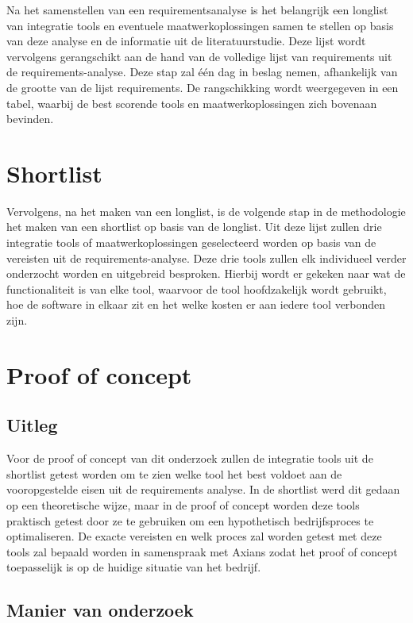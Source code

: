 Na het samenstellen van een requirementsanalyse is het belangrijk een longlist van integratie tools en eventuele maatwerkoplossingen samen te stellen op basis van deze
analyse en de informatie uit de literatuurstudie. Deze lijst wordt vervolgens gerangschikt aan de hand van de volledige lijst van requirements uit de requirements-analyse. Deze stap zal één dag in beslag nemen, afhankelijk van de grootte van de lijst requirements. De rangschikking wordt weergegeven in een tabel, waarbij de best scorende tools en maatwerkoplossingen zich bovenaan bevinden.

\section{Shortlist}
\label{sec:ShortlistBP}

Vervolgens, na het maken van een longlist, is de volgende stap in de methodologie het maken van een shortlist op basis van de longlist. Uit deze lijst zullen drie integratie tools of maatwerkoplossingen geselecteerd worden op basis van de vereisten uit de requirements-analyse. Deze drie tools zullen elk individueel verder onderzocht worden en uitgebreid besproken. Hierbij wordt er gekeken naar wat de functionaliteit is van elke tool, waarvoor de tool hoofdzakelijk wordt gebruikt, hoe de software in elkaar zit en het welke kosten er aan iedere tool verbonden zijn.

\section{Proof of concept}
\label{sec:Proof of conceptBP}

\subsection{Uitleg}
\label{sec:UitlegBP}

Voor de proof of concept van dit onderzoek zullen de integratie tools uit de shortlist getest worden om te zien welke tool het best voldoet aan de vooropgestelde eisen uit de requirements analyse. In de shortlist werd dit gedaan op een theoretische wijze, maar in de proof of concept worden deze tools praktisch getest door ze te gebruiken om een hypothetisch bedrijfsproces te optimaliseren. De exacte vereisten en welk proces zal worden getest met deze tools zal bepaald worden in samenspraak met Axians zodat het proof of concept toepasselijk is op de huidige situatie van het bedrijf.

\subsection{Manier van onderzoek}
\label{sec:Manier van onderzoekBP}

